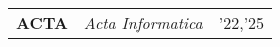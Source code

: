 {{		\begin{tabular}{
		>{\raggedright\arraybackslash\small\bf}p{2.5cm}  %
		>{\raggedright\arraybackslash\small\it}p{12cm}    %
		>{\raggedright\arraybackslash\footnotesize}p{2cm} %
		}
 			{ACTA}& {Acta Informatica}&{'22,'25} \\
 		\end{tabular}
	}
}

